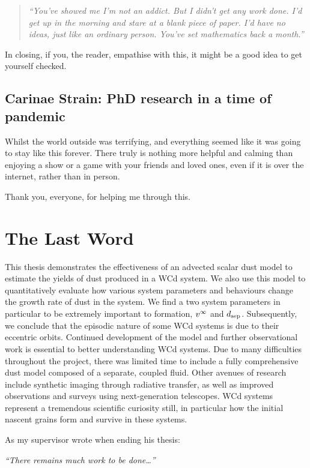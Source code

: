 \begin{quote}
  \emph{
  \noindent
  ``You've showed me I'm not an addict. But I didn't get any work done. I'd get up in the morning and stare at a blank piece of paper. I'd have no ideas, just like an ordinary person. You've set mathematics back a month.''
  }
\end{quote}

\noindent
In closing, if you, the reader, empathise with this, it might be a good idea to get yourself checked.

\subsection{Carinae Strain: PhD research in a time of pandemic}
\label{sec:pandemic}

Whilst the world outside was terrifying, and everything seemed like it was going to stay like this forever.
There truly is nothing more helpful and calming than enjoying a show or a game with your friends and loved ones, even if it is over the internet, rather than in person.

\begin{center}
  Thank you, everyone, for helping me through this.
\end{center}

\section{The Last Word}

This thesis demonstrates the effectiveness of an advected scalar dust model to estimate the yields of dust produced in a WCd system.
We also use this model to quantitatively evaluate how various system parameters and behaviours change the growth rate of dust in the system.
We find a two system parameters in particular to be extremely important to formation, $v^\infty$ and $d_\text{sep}$.
Subsequently, we conclude that the episodic nature of some WCd systems is due to their eccentric orbits.
Continued development of the model and further observational work is essential to better understanding WCd systems.
Due to many difficulties throughout the project, there was limited time to include a fully comprehensive dust model composed of a separate, coupled fluid.
Other avenues of research include synthetic imaging through radiative transfer, as well as improved observations and surveys using next-generation telescopes.
WCd systems represent a tremendous scientific curiosity still, in particular how the initial nascent grains form and survive in these systems.

As my supervisor wrote when ending his thesis:

\begin{center}
  \emph{``There remains much work to be done\ldots''}
\end{center}